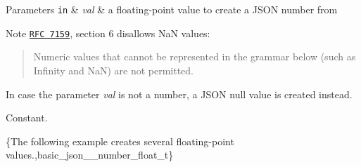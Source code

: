 \begin{DoxyParams}[1]{Parameters}
\mbox{\tt in}  & {\em val} & a floating-\/point value to create a J\-S\-O\-N number from\\
\hline
\end{DoxyParams}
\begin{DoxyNote}{Note}
\href{http://www.rfc-editor.org/rfc/rfc7159.txt}{\tt R\-F\-C 7159}, section 6 disallows Na\-N values\-: \begin{quotation}
Numeric values that cannot be represented in the grammar below (such as Infinity and Na\-N) are not permitted.

\end{quotation}
In case the parameter {\itshape val} is not a number, a J\-S\-O\-N null value is created instead.
\end{DoxyNote}
Constant.

\{The following example creates several floating-\/point values.,basic\-\_\-json\-\_\-\-\_\-number\-\_\-float\-\_\-t\}

